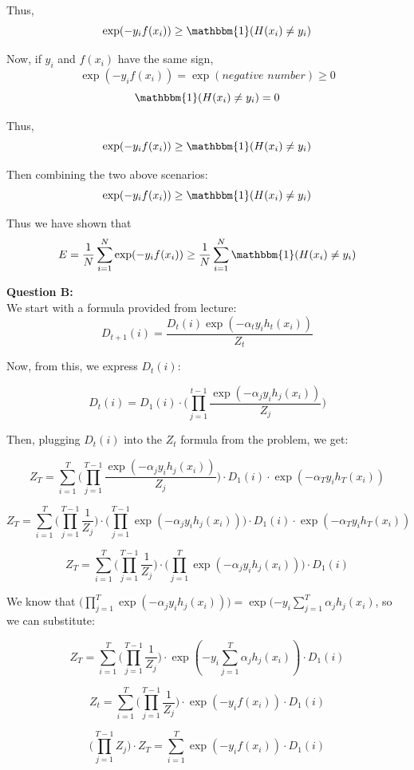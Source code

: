\documentclass[12 pt]{article}
\begin{document}
	Thus, \[ \exp(-y_i f(x_i)) \geq \mathbbm{1} (H(x_i) \neq y_i) \]
	
	Now, if $y_i$ and $f(x_i)$ have the same sign,
	\[ \exp(-y_i f(x_i)) = \exp(\textit{negative number}) \geq 0 \]
	\[ \mathbbm{1} (H(x_i) \neq y_i) = 0 \]

	Thus, 
	\[ \exp(-y_i f(x_i)) \geq \mathbbm{1} (H(x_i) \neq y_i) \]
	
	Then combining the two above scenarios:
	\[ \exp(-y_i f(x_i)) \geq \mathbbm{1} (H(x_i) \neq y_i) \]
	
	Thus we have shown that
	\[ E = \frac{1}{N} \sum_{i = 1}^N \exp(-y_i f(x_i)) \geq \frac{1}{N} \sum_{i = 1}^N
	\mathbbm{1} (H(x_i) \neq y_i) \]
	
	\noindent\textbf{Question B:} \\
	We start with a formula provided from lecture:
	\[ D_{t+1}(i) = \frac{D_t(i) \exp(-\alpha_t y_i h_t(x_i))}{Z_t} \]
	
	Now, from this, we express $D_t(i)$:
	
	\[ D_t(i) = D_1(i) \cdot\Big(  \prod_{j = 1}^{t - 1} \frac{\exp(-\alpha_j y_i h_j(x_i))}{Z_j} \Big)\]
	
	Then, plugging $D_t(i)$ into the $Z_t$ formula from the problem, we get:
	
	\[ Z_T = \sum_{i = 1}^T \Big( \prod_{j = 1}^{T - 1} \frac{\exp(-\alpha_j y_i h_j(x_i))}{Z_j} \Big)
	\cdot D_1(i) \cdot \exp(-\alpha_T y_i h_T(x_i)) \]
	
	\[ Z_T = \sum_{i = 1}^T \Big( \prod_{j = 1}^{T - 1} \frac{1}{Z_j} \Big) \cdot
	\Big( \prod_{j = 1}^{T - 1} \exp(-\alpha_j y_i h_j(x_i)) \Big)
	\cdot D_1(i) \cdot \exp(-\alpha_T y_i h_T(x_i)) \]
	
	\[ Z_T = \sum_{i = 1}^T \Big( \prod_{j = 1}^{T - 1} \frac{1}{Z_j} \Big) \cdot
	\Big( \prod_{j = 1}^{T} \exp(-\alpha_j y_i h_j(x_i)) \Big)
	\cdot D_1(i) \]
	
	We know that $\Big( \prod_{j = 1}^{T} \exp(-\alpha_j y_i h_j(x_i)) \Big) = \exp(-y_i \sum_{j = 1}^T \alpha_j h_j(x_i)$, so we can substitute: 
	
	
	\[ Z_T = \sum_{i = 1}^T \Big( \prod_{j = 1}^{T - 1} \frac{1}{Z_j} \Big) \cdot
	\exp(-y_i \sum_{j = 1}^T \alpha_j h_j(x_i))
	\cdot D_1(i) \]
	
	\[ Z_t = \sum_{i = 1}^T \Big( \prod_{j = 1}^{T - 1} \frac{1}{Z_j} \Big) \cdot
	\exp(-y_i f(x_i))
	\cdot D_1(i) \]
	
	\[ \Big( \prod_{j = 1}^{T - 1} Z_j \Big) \cdot Z_T = \sum_{i = 1}^T
	\exp(-y_i f(x_i))
	\cdot D_1(i) \]
	
\end{document}
